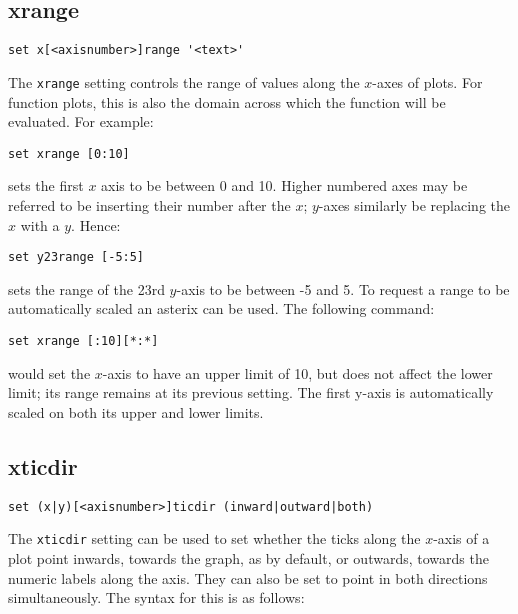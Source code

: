 \subsection{xrange}

\begin{verbatim}
set x[<axisnumber>]range '<text>'
\end{verbatim}

The {\tt xrange} setting controls the range of values along the $x$-axes of
plots.  For function plots, this is also the domain across which the function
will be evaluated.  For example:

\begin{verbatim}
set xrange [0:10]
\end{verbatim}

\noindent sets the first $x$ axis to be between 0 and 10.  Higher numbered axes may be
referred to be inserting their number after the $x$; $y$-axes similarly be
replacing the $x$ with a $y$.  Hence:

\begin{verbatim}
set y23range [-5:5]
\end{verbatim}

\noindent sets the range of the 23rd $y$-axis to be between -5 and 5.  To
request a range to be automatically scaled an asterix can be used.  The
following command:

\begin{verbatim}
set xrange [:10][*:*]
\end{verbatim}

\noindent would set the $x$-axis to have an upper limit of 10, but does not
affect the lower limit; its range remains at its previous setting.  The first
y-axis is automatically scaled on both its upper and lower limits.

\subsection{xticdir}

\begin{verbatim}
set (x|y)[<axisnumber>]ticdir (inward|outward|both)
\end{verbatim}

The {\tt xticdir} setting can be used to set whether the ticks along the
$x$-axis of a plot point inwards, towards the graph, as by default, or outwards,
towards the numeric labels along the axis. They can also be set to point in both
directions simultaneously. The syntax for this is as follows:

